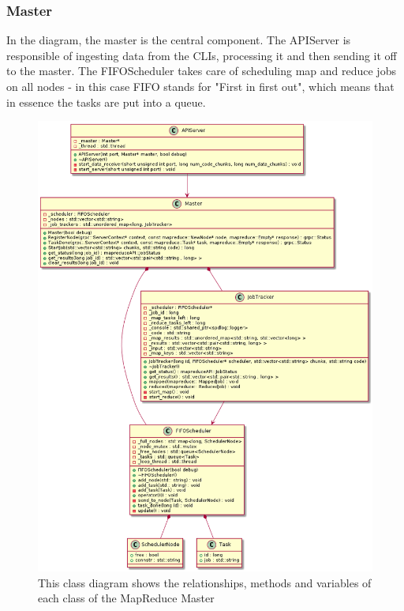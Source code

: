 \documentclass[a4paper]{article}
\begin{document}
\hypertarget{master}{%
\subsubsection{Master}\label{master}}

In the diagram, the master is the central component. The APIServer is responsible of ingesting data from the CLIs, processing it and then sending it off to the master. The FIFOScheduler takes care of scheduling map and reduce jobs on all nodes - in this case FIFO stands for "First in first out", which means that in essence the tasks are put into a queue.

\begin{figure}
\centering
\includegraphics[width=\linewidth]{images/class_diagram_master}
\caption{This class diagram shows the relationships, methods and variables of each class of the MapReduce Master}
\end{figure}
\end{document}
